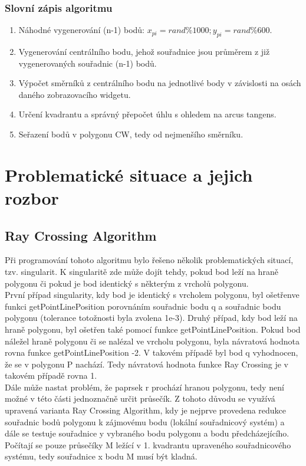 \documentclass[a4paper,11pt,twoside]{article}
\begin{document}
\subsubsection{Slovní zápis algoritmu}
\begin{enumerate}
\item Náhodné vygenerování (n-1) bodů:  $x_{pi} = rand \% 1000; y_{pi} = rand \% 600$.
\item Vygenerování centrálního bodu, jehož souřadnice jsou průměrem z již vygenerovaných souřadnic (n-1) bodů.
\item Výpočet směrníků z centrálního bodu na jednotlivé body v závislosti na osách daného zobrazovacího widgetu.
\item Určení kvadrantu a správný přepočet úhlu s ohledem na arcus tangens.
\item Seřazení bodů v polygonu CW, tedy od nejmenšího směrníku.
\end{enumerate}

\newpage
\vspace*{-1cm}
\section{Problematické situace a jejich rozbor}
\subsection{Ray Crossing Algorithm}
\large
Při programování tohoto algoritmu bylo řešeno několik problematických situací, tzv. singularit. K singularitě zde může dojít tehdy, pokud bod leží na hraně polygonu či pokud je bod identický s některým z vrcholů polygonu. \\
\indent První případ singularity, kdy bod je identický s vrcholem polygonu, byl ošetřenve funkci getPointLinePosition porovnáním souřadnic bodu q a souřadnic bodu polygonu (tolerance totožnosti byla zvolena 1e-3). Druhý případ, kdy bod leží na hraně polygonu, byl ošetřen také pomocí funkce getPointLinePosition. Pokud bod náležel hraně polygonu či se nalézal ve vrcholu polygonu, byla návratová hodnota rovna funkce getPointLinePosition -2. V takovém případě byl bod q vyhodnocen, že se v polygonu P nachází. Tedy návratová hodnota funkce Ray Crossing je v takovém případě rovna 1.\\
\indent Dále může nastat problém, že paprsek r prochází hranou polygonu, tedy není možné v této části jednoznačně určit průsečík. Z tohoto důvodu se využívá upravená varianta Ray Crossing Algorithm, kdy je nejprve provedena redukce souřadnic bodů polygonu k zájmovému bodu (lokální souřadnicový systém) a dále se testuje souřadnice y vybraného bodu polygonu a bodu předcházejícího. Počítají se pouze průsečíky M ležící v 1. kvadrantu upraveného souřadnicového systému, tedy souřadnice x bodu M musí být kladná.
\end{document}

